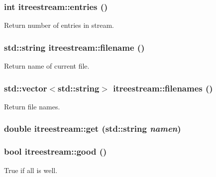 \hypertarget{classitreestream_a20}{
\subsubsection[entries]{\setlength{\rightskip}{0pt plus 5cm}int itreestream::entries ()}}
\label{classitreestream_a20}


Return number of entries in stream. 

\hypertarget{classitreestream_a26}{
\subsubsection[filename]{\setlength{\rightskip}{0pt plus 5cm}std::string itreestream::filename ()}}
\label{classitreestream_a26}


Return name of current file. 

\hypertarget{classitreestream_a27}{
\subsubsection[filenames]{\setlength{\rightskip}{0pt plus 5cm}std::vector$<$std::string$>$ itreestream::filenames ()}}
\label{classitreestream_a27}


Return file names. 

\hypertarget{classitreestream_a30}{
\subsubsection[get]{\setlength{\rightskip}{0pt plus 5cm}double itreestream::get (std::string {\em namen})}}
\label{classitreestream_a30}


\hypertarget{classitreestream_a6}{
\subsubsection[good]{\setlength{\rightskip}{0pt plus 5cm}bool itreestream::good ()}}
\label{classitreestream_a6}


True if all is well. 

